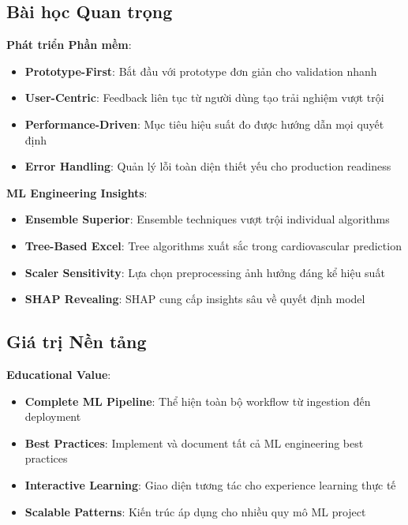 \subsection{Bài học Quan trọng}\label{subsec:key-lessons}

\textbf{Phát triển Phần mềm}:
\begin{itemize}
    \item \textbf{Prototype-First}: Bắt đầu với prototype đơn giản cho validation nhanh
    \item \textbf{User-Centric}: Feedback liên tục từ người dùng tạo trải nghiệm vượt trội
    \item \textbf{Performance-Driven}: Mục tiêu hiệu suất đo được hướng dẫn mọi quyết định
    \item \textbf{Error Handling}: Quản lý lỗi toàn diện thiết yếu cho production readiness
\end{itemize}

\textbf{ML Engineering Insights}:
\begin{itemize}
    \item \textbf{Ensemble Superior}: Ensemble techniques vượt trội individual algorithms
    \item \textbf{Tree-Based Excel}: Tree algorithms xuất sắc trong cardiovascular prediction
    \item \textbf{Scaler Sensitivity}: Lựa chọn preprocessing ảnh hưởng đáng kể hiệu suất
    \item \textbf{SHAP Revealing}: SHAP cung cấp insights sâu về quyết định model
\end{itemize}

\subsection{Giá trị Nền tảng}\label{subsec:platform-value}

\textbf{Educational Value}:
\begin{itemize}
    \item \textbf{Complete ML Pipeline}: Thể hiện toàn bộ workflow từ ingestion đến deployment
    \item \textbf{Best Practices}: Implement và document tất cả ML engineering best practices
    \item \textbf{Interactive Learning}: Giao diện tương tác cho experience learning thực tế
    \item \textbf{Scalable Patterns}: Kiến trúc áp dụng cho nhiều quy mô ML project
\end{itemize}

